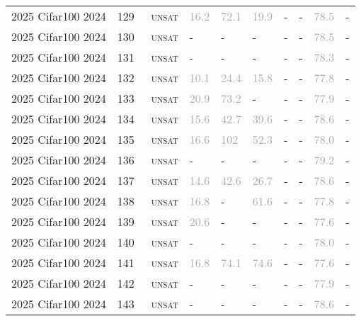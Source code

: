 \begin{center}
{\begin{longtable}{@{}llllllllll@{}}
2025 Cifar100 2024 & 129 & ~\textsc{unsat} & \textcolor{darkgray}{16.2} & \textcolor{darkgray}{72.1} & \textcolor{darkgray}{19.9} & - & - & \textcolor{darkgray}{78.5} & - \\
2025 Cifar100 2024 & 130 & ~\textsc{unsat} & - & - & - & - & - & \textcolor{darkgray}{78.5} & - \\
2025 Cifar100 2024 & 131 & ~\textsc{unsat} & - & - & - & - & - & \textcolor{darkgray}{78.3} & - \\
2025 Cifar100 2024 & 132 & ~\textsc{unsat} & \textcolor{darkgray}{10.1} & \textcolor{darkgray}{24.4} & \textcolor{darkgray}{15.8} & - & - & \textcolor{darkgray}{77.8} & - \\
2025 Cifar100 2024 & 133 & ~\textsc{unsat} & \textcolor{darkgray}{20.9} & \textcolor{darkgray}{73.2} & - & - & - & \textcolor{darkgray}{77.9} & - \\
2025 Cifar100 2024 & 134 & ~\textsc{unsat} & \textcolor{darkgray}{15.6} & \textcolor{darkgray}{42.7} & \textcolor{darkgray}{39.6} & - & - & \textcolor{darkgray}{78.6} & - \\
2025 Cifar100 2024 & 135 & ~\textsc{unsat} & \textcolor{darkgray}{16.6} & \textcolor{darkgray}{102} & \textcolor{darkgray}{52.3} & - & - & \textcolor{darkgray}{78.0} & - \\
2025 Cifar100 2024 & 136 & ~\textsc{unsat} & - & - & - & - & - & \textcolor{darkgray}{79.2} & - \\
2025 Cifar100 2024 & 137 & ~\textsc{unsat} & \textcolor{darkgray}{14.6} & \textcolor{darkgray}{42.6} & \textcolor{darkgray}{26.7} & - & - & \textcolor{darkgray}{78.6} & - \\
2025 Cifar100 2024 & 138 & ~\textsc{unsat} & \textcolor{darkgray}{16.8} & - & \textcolor{darkgray}{61.6} & - & - & \textcolor{darkgray}{77.8} & - \\
2025 Cifar100 2024 & 139 & ~\textsc{unsat} & \textcolor{darkgray}{20.6} & - & - & - & - & \textcolor{darkgray}{77.6} & - \\
2025 Cifar100 2024 & 140 & ~\textsc{unsat} & - & - & - & - & - & \textcolor{darkgray}{78.0} & - \\
2025 Cifar100 2024 & 141 & ~\textsc{unsat} & \textcolor{darkgray}{16.8} & \textcolor{darkgray}{74.1} & \textcolor{darkgray}{74.6} & - & - & \textcolor{darkgray}{77.6} & - \\
2025 Cifar100 2024 & 142 & ~\textsc{unsat} & - & - & - & - & - & \textcolor{darkgray}{77.9} & - \\
2025 Cifar100 2024 & 143 & ~\textsc{unsat} & - & - & - & - & - & \textcolor{darkgray}{78.6} & - \\

\end{longtable}}
\end{center}
